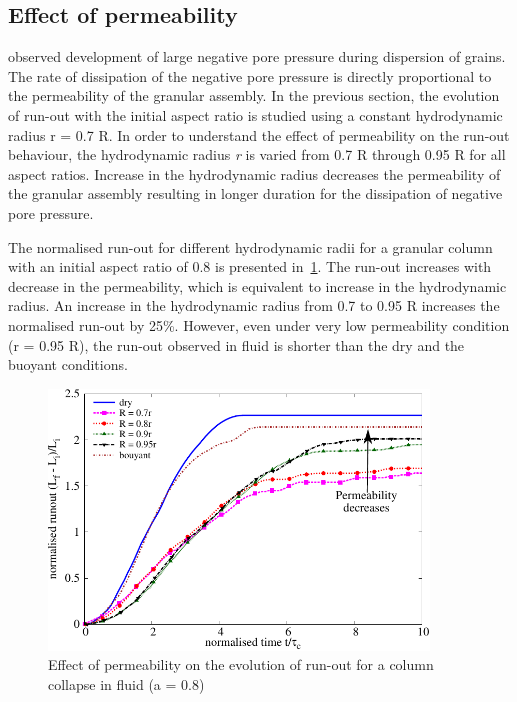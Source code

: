 \clearpage

\subsection{Effect of permeability}
\citet{Topin2011} observed development of large negative pore pressure during 
dispersion of grains. The rate of dissipation of the negative pore pressure is 
directly proportional to the permeability of the granular assembly. In the 
previous section, the evolution of run-out with the initial aspect ratio is 
studied using a constant hydrodynamic radius r = 0.7 R. In order to understand 
the effect of permeability on the run-out behaviour, the hydrodynamic radius 
\textit{r} 
is varied from 0.7 R through 0.95 R for all aspect ratios. Increase in 
the hydrodynamic radius decreases the permeability of the granular assembly 
resulting in longer duration for the dissipation of negative pore pressure. 

The normalised run-out for different hydrodynamic radii for a granular column 
with an initial aspect ratio of 0.8 is presented 
in~\cref{fig:Runout_a08_dense}. The run-out increases with decrease in the 
permeability, which is equivalent to increase in the hydrodynamic radius. An 
increase in the hydrodynamic radius from 0.7 to 0.95 R increases the 
normalised run-out by 25\%. However, even under very low permeability condition 
(r = 0.95 R), the run-out observed in fluid is shorter than the dry and the 
buoyant conditions. 

\begin{figure}[htpb]
\centering
\includegraphics[width=0.9\textwidth]{Runout_a08_dense}
\caption{Effect of permeability on the evolution of run-out for a column 
collapse in fluid (a = 0.8)}
\label{fig:Runout_a08_dense}
\end{figure}

